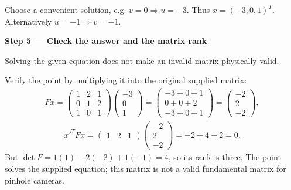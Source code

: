 \documentclass[letterpaper,11pt,english,openany,oneside]{jupyterBook}
\begin{document}
\sphinxAtStartPar
Choose a convenient solution, e.g. {\color{QuizMathBlue} \(v=0\Rightarrow u=-3\)}. Thus {\color{QuizMathBlue} \(\boxed{x=(-3,0,1)^T}\)}. Alternatively {\color{QuizMathBlue} \(u=-1\Rightarrow v=-1\)}.

\par

\par\medskip{}
{\color{QuizStepRed}\bfseries Step 5 — Check the answer and the matrix rank}\par\smallskip

\sphinxAtStartPar
{} Solving the given equation does not make an invalid matrix physically valid.

\sphinxAtStartPar
Verify the point by multiplying it into the original supplied matrix:
{\color{QuizMathBlue} \begin{equation*}
\begin{split}
Fx=\begin{pmatrix}1&2&1\\0&1&2\\1&0&1\end{pmatrix}\begin{pmatrix}-3\\0\\1\end{pmatrix}
=\begin{pmatrix}-3+0+1\\0+0+2\\-3+0+1\end{pmatrix}
=\begin{pmatrix}-2\\2\\-2\end{pmatrix},
\end{split}
\end{equation*}}{\color{QuizMathBlue} \begin{equation*}
\begin{split}
x'^TFx=\begin{pmatrix}1&2&1\end{pmatrix}\begin{pmatrix}-2\\2\\-2\end{pmatrix}=-2+4-2=0.
\end{split}
\end{equation*}}
\sphinxAtStartPar
But {\color{QuizMathBlue} \(\det F=1(1)-2(-2)+1(-1)=4\)}, so its rank is three. The point solves the supplied equation; this matrix is not a valid fundamental matrix for pinhole cameras.
\end{document}
